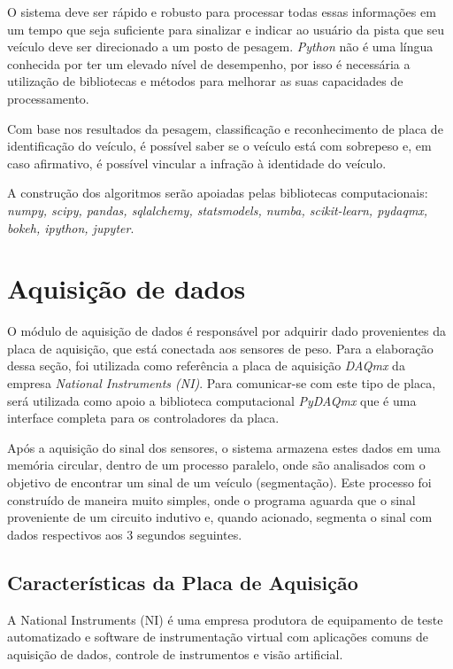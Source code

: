 \documentclass{ufscThesis}
\begin{document}
O sistema deve ser rápido e robusto para processar todas essas informações em um tempo que seja suficiente para sinalizar e indicar ao usuário da pista que seu veículo deve ser direcionado a um posto de pesagem. \textit{Python} não é uma língua conhecida por ter um elevado nível de desempenho, por isso é necessária a utilização de bibliotecas e métodos para melhorar as suas capacidades de processamento.

Com base nos resultados da pesagem, classificação e reconhecimento de placa de identificação do veículo, é possível saber se o veículo está com sobrepeso e, em caso afirmativo, é possível vincular a infração à identidade do veículo.

A construção dos algoritmos serão apoiadas pelas bibliotecas computacionais: \textit{numpy, scipy, pandas, sqlalchemy, statsmodels, numba, scikit-learn, pydaqmx, bokeh, ipython, jupyter}.

\section{Aquisição de dados}\label{algoritmos-daq}
O módulo de aquisição de dados é responsável por adquirir dado provenientes da placa de aquisição, que está conectada aos sensores de peso. Para a elaboração dessa seção, foi utilizada como referência a placa de aquisição \textit{DAQmx} da empresa \textit{National Instruments (NI)}. Para comunicar-se com este tipo de placa, será utilizada como apoio a biblioteca computacional \textit{PyDAQmx} que é uma interface completa para os controladores da placa.

Após a aquisição do sinal dos sensores, o sistema armazena estes dados em uma memória circular, dentro de um processo paralelo, onde são analisados com o objetivo de encontrar um sinal de um veículo (segmentação). Este processo foi construído de maneira muito simples, onde o programa aguarda que o sinal proveniente de um circuito indutivo e, quando acionado, segmenta o sinal com dados respectivos aos 3 segundos seguintes.


\subsection{Características da Placa de Aquisição}\label{placa-aquisicao}

A National Instruments (NI) é uma empresa produtora de equipamento de teste automatizado e software de instrumentação virtual com aplicações comuns de aquisição de dados, controle de instrumentos e visão artificial.
\end{document}
